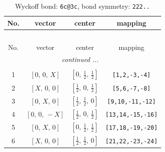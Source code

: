 \documentclass[fleqn,8pt]{jsarticle}
\begin{document}
\begin{longtable}{cccc}
\caption{Wyckoff bond: {\tt 6c@3c}, bond symmetry: {\tt 222..}}
 \\
 \hline \hline
No. & vector & center & mapping \\ \hline \endfirsthead

\multicolumn{3}{l}{\tablename\ \thetable{}} \\
 \hline \hline
No. & vector & center & mapping \\ \hline \endhead

 \hline \hline
\multicolumn{3}{r}{\footnotesize\it continued ...} \\ \endfoot

 \hline \hline
\multicolumn{3}{r}{} \\ \endlastfoot

1 & $\left[ 0,\, 0,\, X \right]$ & $\left[ 0,\, \frac{1}{2},\, \frac{1}{2} \right]$ & {\tt [1,2,-3,-4]} \\ \hline
2 & $\left[ X,\, 0,\, 0 \right]$ & $\left[ \frac{1}{2},\, 0,\, \frac{1}{2} \right]$ & {\tt [5,6,-7,-8]} \\ \hline
3 & $\left[ 0,\, X,\, 0 \right]$ & $\left[ \frac{1}{2},\, \frac{1}{2},\, 0 \right]$ & {\tt [9,10,-11,-12]} \\ \hline
4 & $\left[ 0,\, 0,\, - X \right]$ & $\left[ \frac{1}{2},\, 0,\, \frac{1}{2} \right]$ & {\tt [13,14,-15,-16]} \\ \hline
5 & $\left[ 0,\, X,\, 0 \right]$ & $\left[ 0,\, \frac{1}{2},\, \frac{1}{2} \right]$ & {\tt [17,18,-19,-20]} \\ \hline
6 & $\left[ X,\, 0,\, 0 \right]$ & $\left[ \frac{1}{2},\, \frac{1}{2},\, 0 \right]$ & {\tt [21,22,-23,-24]} \\
\end{longtable}
\renewcommand{\arraystretch}{1.2}
\end{document}
